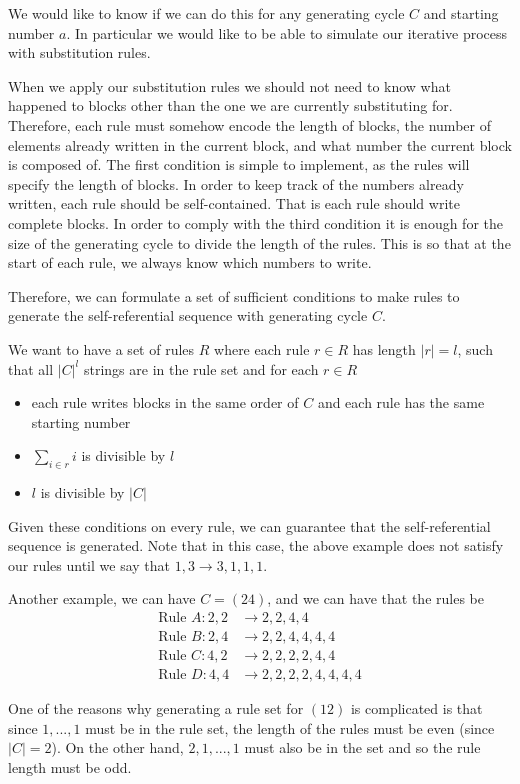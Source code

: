 \documentclass[runningheads,a4paper]{llncs}
\begin{document}
We would like to know if we can do this for any generating cycle $C$ and starting number $a$. In particular we would like to be able to simulate our iterative process with substitution rules.

When we apply our substitution rules we should not need to know what happened to blocks other than the one we are currently substituting for. Therefore, each rule must somehow encode the length of  blocks, the number of elements already written in the current block, and what number the current block is composed of. The first condition is simple to implement, as the rules will specify the length of blocks. In order to keep track of the numbers already written, each rule should be self-contained. That is each rule should write complete blocks. In order to comply with the third condition it is enough for the size of the generating cycle to divide the length of the rules. This is so that at the start of each rule, we always know which numbers to write.

Therefore, we can formulate a set of sufficient conditions to make rules to generate the self-referential sequence with generating cycle $C$. 

We want to have a set of rules $R$ where each rule $r \in R$ has length $|r| = l$, such that all $|C|^{l}$ strings are in the rule set and for each $r \in R$
\begin{itemize}
\item each rule writes blocks in the same order of $C$ and each rule has the same starting number
\item $\sum_{i \in r} i$ is divisible by $l$
\item $l$ is divisible by $|C|$
\end{itemize}
Given these conditions on every rule, we can guarantee that the self-referential sequence is generated. Note that in this case, the above example does not satisfy our rules until we say that $1, 3 \to 3, 1, 1, 1$.

Another example, we can have $C = (2 4)$, and we can have that the rules be
\begin{align*}
\text{Rule }A: 2,2 &\to 2, 2, 4, 4 \\
\text{Rule }B: 2,4 &\to 2, 2, 4,4,4,4\\
\text{Rule }C: 4,2 &\to 2,2,2,2,4,4\\
\text{Rule }D: 4,4 &\to 2, 2, 2, 2, 4, 4, 4, 4
\end{align*}

One of the reasons why generating a rule set for $(1 2)$ is complicated is that since $1, ..., 1$ must be in the rule set, the length of the rules must be even (since $|C| = 2$). On the other hand, $2, 1, ..., 1$ must also be in the set and so the rule length must be odd. 
\end{document}
